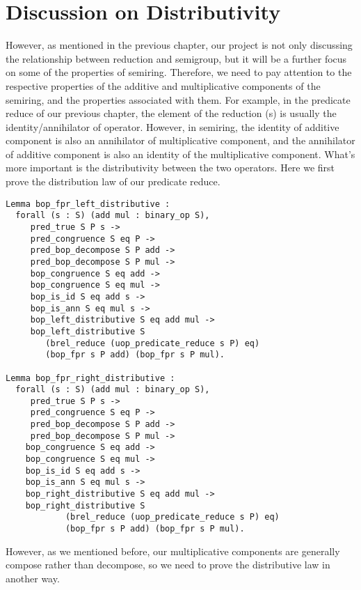 \documentclass[a4paper,12pt,twoside,openright]{report}
\begin{document}
\section{Discussion on Distributivity}
However, as mentioned in the previous chapter, our project is not only discussing the relationship between reduction and semigroup, but it will be a further focus on some of the properties of semiring. 
Therefore, we need to pay attention to the respective properties of the additive and multiplicative components of the semiring, and the properties associated with them.
For example, in the predicate reduce of our previous chapter, the element of the reduction (s) is usually the identity/annihilator of operator. However, in semiring, the identity of additive component is also an annihilator of multiplicative component, and the annihilator of additive component is also an identity of the multiplicative component.
What's more important is the distributivity between the two operators.
Here we first prove the distribution law of our predicate reduce.
\begin{lstlisting}
Lemma bop_fpr_left_distributive :
  forall (s : S) (add mul : binary_op S),
     pred_true S P s -> 
     pred_congruence S eq P ->
     pred_bop_decompose S P add ->
     pred_bop_decompose S P mul ->          
     bop_congruence S eq add ->     
     bop_congruence S eq mul -> 
     bop_is_id S eq add s ->     
     bop_is_ann S eq mul s ->
     bop_left_distributive S eq add mul ->
     bop_left_distributive S 
     	(brel_reduce (uop_predicate_reduce s P) eq) 
     	(bop_fpr s P add) (bop_fpr s P mul).
       
Lemma bop_fpr_right_distributive :
  forall (s : S) (add mul : binary_op S),
     pred_true S P s -> 
     pred_congruence S eq P ->
     pred_bop_decompose S P add ->
     pred_bop_decompose S P mul ->          
    bop_congruence S eq add ->     
    bop_congruence S eq mul -> 
    bop_is_id S eq add s ->     
    bop_is_ann S eq mul s ->
    bop_right_distributive S eq add mul ->
    bop_right_distributive S 
    		(brel_reduce (uop_predicate_reduce s P) eq) 
    		(bop_fpr s P add) (bop_fpr s P mul).
\end{lstlisting}
However, as we mentioned before, our multiplicative components are generally compose rather than decompose, so we need to prove the distributive law in another way.
\end{document}

